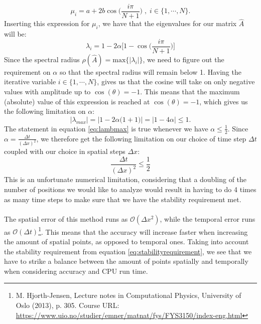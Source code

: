\documentclass[reprint,english,notitlepage]{revtex4-1}  %
\begin{document}
\begin{equation}\label{eq:muieigenvalues}
    \mu_i = a+2b\cos{\Big(\frac{i\pi}{N+1}\Big)}\;,\;i\in\{1,\cdots,N\}.
\end{equation}
Inserting this expression for $\mu_i$, we have that the eigenvalues for our matrix $\hat{A}$ will be:
\begin{equation}\label{eq:plsbelow}
    \lambda_i = 1-2\alpha\Big[1-\cos{\Big(\frac{i\pi}{N+1}\Big)}\Big]
\end{equation}
Since the spectral radius $\rho(\hat{A}) = \text{max}\{|\lambda_i|\}$, we need to figure out the requirement on $\alpha$ so that the spectral radius will remain below 1. Having the iterative variable $i \in \{1,\cdots,N\}$, gives us that the cosine will take on only negative values with amplitude up to $\cos{(\theta)} = -1$. This means that the maximum (absolute) value of this expression is reached at $\cos{(\theta)} = -1$, which gives us the following limitation on $\alpha$:
\begin{equation}\label{eq:lambmax}
    |\lambda_{max}| = |1-2\alpha\big(1+1\big)| = |1-4\alpha| \leq 1.
\end{equation}
The statement in equation \ref{eq:lambmax} is true whenever we have $\alpha \leq \frac{1}{2}$. Since $\alpha = \frac{\Delta t}{(\Delta x)^2}$, we therefore get the following limitation on our choice of time step $\Delta t$ coupled with our choice in spatial steps $\Delta x$:
\begin{equation}\label{eq:stabilityrequirement}
    \frac{\Delta t}{(\Delta x)^2} \leq \frac{1}{2}
\end{equation}
This is an unfortunate numerical limitation, considering that a doubling of the number of positions we would like to analyze would result in having to do 4 times as many time steps to make sure that we have the stability requirement met.
\\
\\
The spatial error of this method runs as $\mathcal{O}(\Delta x^2)$, while the temporal error runs as $\mathcal{O}(\Delta t)$\footnote{M. Hjorth-Jensen, Lecture notes in Computational Physics, University of Oslo (2013), p. 305. Course URL: \url{https://www.uio.no/studier/emner/matnat/fys/FYS3150/index-eng.html}}. This means that the accuracy will increase faster when increasing the amount of spatial points, as opposed to temporal ones. Taking into account the stability requirement from equation \ref{eq:stabilityrequirement}, we see that we have to strike a balance between the amount of points spatially and temporally when considering accuracy and CPU run time.
\end{document}
